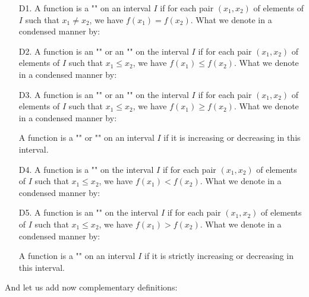 	\begin{itemize}
		\item[D1.] A function is a "" on an interval $I$ if for each pair $(x_1,x_2)$ of elements of $I$ such that $x_1\neq x_2$, we have $f(x_1)=f(x_2)$. What we denote in a condensed manner by:
		
		
		\item[D2.] A function is an "" or an "" on the interval $I$ if for each pair $(x_1,x_2)$ of elements of $I$ such that $x_1\leq x_2$, we have $f(x_1)\leq f(x_2)$. What we denote in a condensed manner by:
		
		
		\item[D3.] A function is an "" or an "" on the interval $I$ if for each pair $(x_1,x_2)$ of elements of $I$ such that $x_1\leq x_2$, we have $f(x_1)\geq f(x_2)$. What we denote in a condensed manner by:
		
		\begin{tcolorbox}[title=Remark,colframe=black,arc=10pt]
		A function is a "" or "" on an interval $I$ if it is increasing or decreasing in this interval.
		\end{tcolorbox}
		
		\item[D4.] A function is a ""  on the interval $I$ if for each pair $(x_1,x_2)$ of elements of $I$ such that $x_1\leq x_2$, we have $f(x_1)< f(x_2)$. What we denote in a condensed manner by:
		
		
		\item[D5.] A function is an ""  on the interval $I$ if for each pair $(x_1,x_2)$ of elements of $I$ such that $x_1\leq x_2$, we have $f(x_1)> f(x_2)$. What we denote in a condensed manner by:
		
		\begin{tcolorbox}[title=Remark,colframe=black,arc=10pt]
		A function is a "" on an interval $I$ if it is strictly increasing or decreasing in this interval.
		\end{tcolorbox}
	\end{itemize}
	And let us add now complementary definitions:
	
